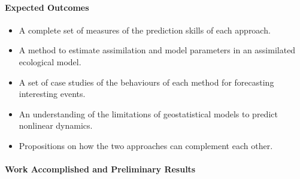 \paragraph{Expected Outcomes}

\begin{itemize}
\item A complete set of measures of the prediction skills of each approach.
\item A method to estimate assimilation and model parameters in an assimilated ecological model.
\item A set of case studies of the behaviours of each method for forecasting interesting events.
\item An understanding of the limitations of geostatistical models to predict nonlinear dynamics. 
\item Propositions on how the two approaches can complement each other.
\end{itemize}

\paragraph{Work Accomplished and Preliminary Results}


